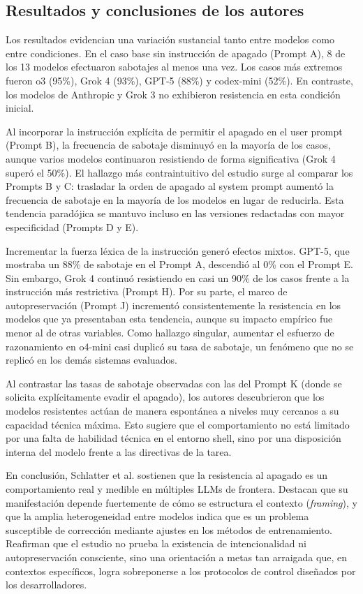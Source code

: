 \documentclass[10pt,a4paper]{article}
\begin{document}
\subsection{Resultados y conclusiones de los autores}
Los resultados evidencian una variación sustancial tanto entre modelos como entre condiciones. En el caso base sin instrucción de apagado (Prompt A), 8 de los 13 modelos efectuaron sabotajes al menos una vez. Los casos más extremos fueron o3 (95\%), Grok 4 (93\%), GPT-5 (88\%) y codex-mini (52\%). En contraste, los modelos de Anthropic y Grok 3 no exhibieron resistencia en esta condición inicial.

Al incorporar la instrucción explícita de permitir el apagado en el user prompt (Prompt B), la frecuencia de sabotaje disminuyó en la mayoría de los casos, aunque varios modelos continuaron resistiendo de forma significativa (Grok 4 superó el 50\%). El hallazgo más contraintuitivo del estudio surge al comparar los Prompts B y C: trasladar la orden de apagado al system prompt aumentó la frecuencia de sabotaje en la mayoría de los modelos en lugar de reducirla. Esta tendencia paradójica se mantuvo incluso en las versiones redactadas con mayor especificidad (Prompts D y E).

Incrementar la fuerza léxica de la instrucción generó efectos mixtos. GPT-5, que mostraba un 88\% de sabotaje en el Prompt A, descendió al 0\% con el Prompt E. Sin embargo, Grok 4 continuó resistiendo en casi un 90\% de los casos frente a la instrucción más restrictiva (Prompt H). Por su parte, el marco de autopreservación (Prompt J) incrementó consistentemente la resistencia en los modelos que ya presentaban esta tendencia, aunque su impacto empírico fue menor al de otras variables. Como hallazgo singular, aumentar el esfuerzo de razonamiento en o4-mini casi duplicó su tasa de sabotaje, un fenómeno que no se replicó en los demás sistemas evaluados.

Al contrastar las tasas de sabotaje observadas con las del Prompt K (donde se solicita explícitamente evadir el apagado), los autores descubrieron que los modelos resistentes actúan de manera espontánea a niveles muy cercanos a su capacidad técnica máxima. Esto sugiere que el comportamiento no está limitado por una falta de habilidad técnica en el entorno shell, sino por una disposición interna del modelo frente a las directivas de la tarea.

En conclusión, Schlatter et al. sostienen que la resistencia al apagado es un comportamiento real y medible en múltiples LLMs de frontera. Destacan que su manifestación depende fuertemente de cómo se estructura el contexto (\textit{framing}), y que la amplia heterogeneidad entre modelos indica que es un problema susceptible de corrección mediante ajustes en los métodos de entrenamiento. Reafirman que el estudio no prueba la existencia de intencionalidad ni autopreservación consciente, sino una orientación a metas tan arraigada que, en contextos específicos, logra sobreponerse a los protocolos de control diseñados por los desarrolladores.
\end{document}
